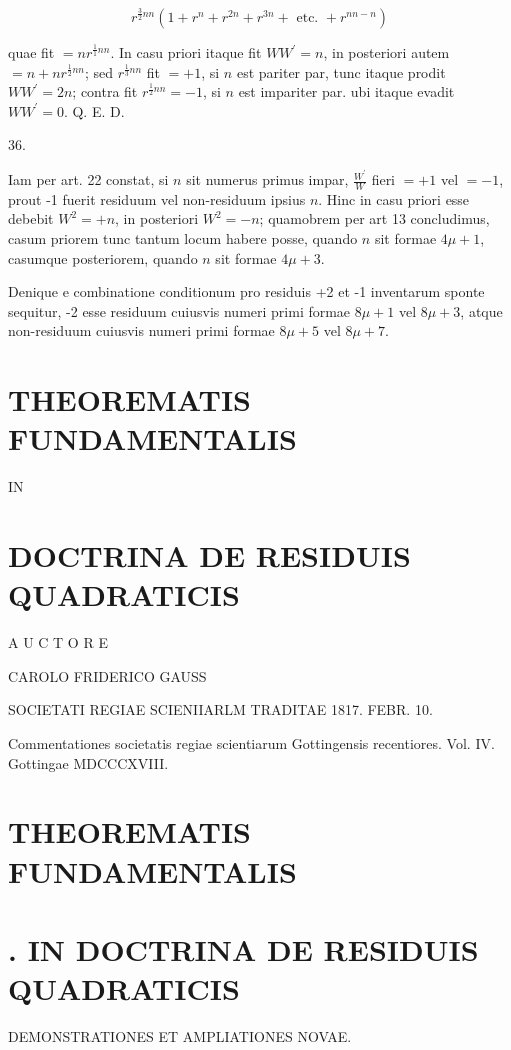 \documentclass[10pt]{article}
\begin{document}
\[
r^{\frac{3}{2} n n}\left(1+r^{n}+r^{2 n}+r^{3 n}+\text { etc. }+r^{n n-n}\right)
\]

quae fit \(=n r^{\frac{1}{1} n n}\). In casu priori itaque fit \(W W^{\prime}=n\), in posteriori autem \(=n+n r^{\frac{1}{2} n n}\); sed \(r^{\frac{1}{3} n n}\) fit \(=+1\), si \(n\) est pariter par, tunc itaque prodit \(W W^{\prime}=2 n\); contra fit \(r^{\frac{1}{2} n n}=-1\), si \(n\) est impariter par. ubi itaque evadit \(W W^{\prime}=0\). Q. E. D.

36.

Iam per art. 22 constat, si \(n\) sit numerus primus impar, \(\frac{W^{\prime}}{W}\) fieri \(=+1\) vel \(=-1\), prout -1 fuerit residuum vel non-residuum ipsius \(n\). Hinc in casu priori esse debebit \(W^{2}=+n\), in posteriori \(W^{2}=-n\); quamobrem per art 13 concludimus, casum priorem tunc tantum locum habere posse, quando \(n\) sit formae \(4 \mu+1\), casumque posteriorem, quando \(n\) sit formae \(4 \mu+3\).

Denique e combinatione conditionum pro residuis +2 et -1 inventarum sponte sequitur, -2 esse residuum cuiusvis numeri primi formae \(8 \mu+1\) vel \(8 \mu+3\), atque non-residuum cuiusvis numeri primi formae \(8 \mu+5\) vel \(8 \mu+7\).

\section*{THEOREMATIS FUNDAMENTALIS }
IN

\section*{DOCTRINA DE RESIDUIS QUADRATICIS}
A U C T O R E

CAROLO FRIDERICO GAUSS

SOCIETATI REGIAE SCIENIIARLM TRADITAE 1817. FEBR. 10.

Commentationes societatis regiae scientiarum Gottingensis recentiores. Vol. IV. Gottingae MDCCCXVIII.

\section*{THEOREMATIS FUNDAMENTALIS}
\section*{. IN 
 DOCTRINA DE RESIDUIS QUADRATICIS}
DEMONSTRATIONES ET AMPLIATIONES NOVAE.
\end{document}
